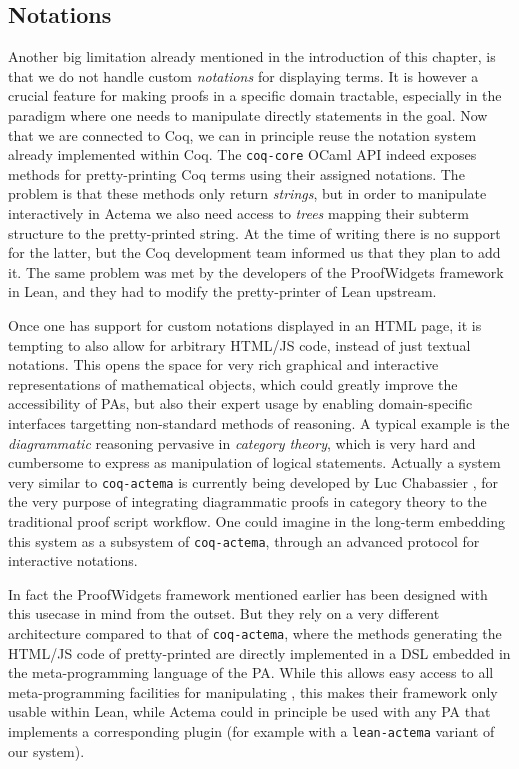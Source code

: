\subsection{Notations}

Another big limitation already mentioned in the introduction of this chapter, is
that we do not handle custom \emph{notations} for displaying
terms. It is however a crucial feature for making proofs in a specific
domain tractable, especially in the  paradigm where one needs to
manipulate directly statements in the goal. Now that we are connected to Coq, we
can in principle reuse the notation system already implemented within Coq. The
\texttt{coq-core} OCaml API indeed exposes methods for pretty-printing Coq terms
using their assigned notations. The problem is that these methods only return
\emph{strings}, but in order to manipulate  interactively in Actema we also
need access to \emph{trees} mapping their subterm structure to the
pretty-printed string. At the time of writing there is no support for the
latter, but the Coq development team informed us that they plan to add it. The
same problem was met by the developers of the ProofWidgets framework in Lean,
and they had to modify the pretty-printer of Lean upstream.

Once one has support for custom notations displayed in an HTML page, it is
tempting to also allow for arbitrary HTML/JS code, instead of just textual
notations. This opens the space for very rich graphical and interactive
representations of mathematical objects, which could greatly improve the
accessibility of PAs, but also their expert usage by enabling domain-specific
interfaces targetting non-standard methods of reasoning. A typical example is
the \emph{diagrammatic} reasoning pervasive in \emph{category theory}, which is
very hard and cumbersome to express as manipulation of logical statements.
Actually a system very similar to \texttt{coq-actema} is currently being
developed by Luc Chabassier \cite{LucTalk}, for the very purpose of integrating
diagrammatic proofs in category theory to the traditional proof script workflow.
One could imagine in the long-term embedding this system as a subsystem of
\texttt{coq-actema}, through an advanced protocol for interactive notations.

In fact the ProofWidgets framework mentioned earlier has been designed with this
usecase in mind from the outset. But they rely on a very different architecture
compared to that of \texttt{coq-actema}, where the methods generating the
HTML/JS code of pretty-printed  are directly implemented in a DSL embedded
in the meta-programming language of the PA. While this allows easy access to all
meta-programming facilities for manipulating , this makes their framework
only usable within Lean, while Actema could in principle be used with any PA
that implements a corresponding plugin (for example with a \texttt{lean-actema}
variant of our system).

